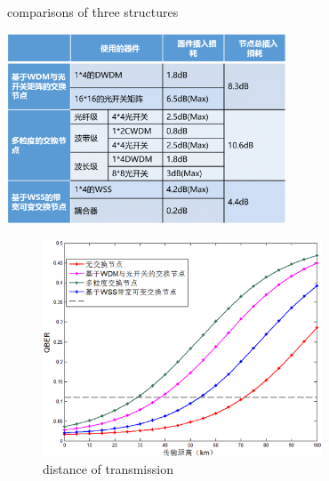 \documentclass[letterpaper,10pt]{article}
\begin{document}
\begin{table}[htb]
  \caption{comparisons of three structures}
  \centering
  \label{tbl:excel-table}
    \includegraphics[width=8.3cm]{comparisons_of_three_switching_node}
\end{table}

\begin{figure}[htbp]
  \centering
  \includegraphics[width=8.3cm]{distance_of_transmission}
  \caption{distance of transmission}
\end{figure}
\end{document}
